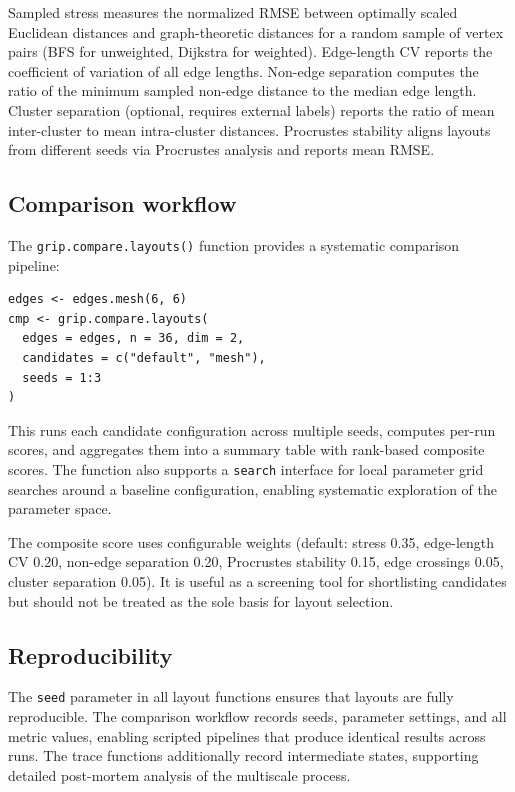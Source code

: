 Sampled stress measures the normalized RMSE between optimally scaled
Euclidean distances and graph-theoretic distances for a random sample of
vertex pairs (BFS for unweighted, Dijkstra for weighted). Edge-length
CV reports the coefficient of variation of all edge lengths. Non-edge
separation computes the ratio of the minimum sampled non-edge distance
to the median edge length. Cluster separation (optional, requires
external labels) reports the ratio of mean inter-cluster to mean
intra-cluster distances. Procrustes stability aligns layouts from
different seeds via Procrustes analysis and reports mean RMSE.

\subsection{Comparison workflow}

The \texttt{grip.compare.layouts()} function provides a systematic
comparison pipeline:

\begin{verbatim}
edges <- edges.mesh(6, 6)
cmp <- grip.compare.layouts(
  edges = edges, n = 36, dim = 2,
  candidates = c("default", "mesh"),
  seeds = 1:3
)
\end{verbatim}

This runs each candidate configuration across multiple seeds, computes
per-run scores, and aggregates them into a summary table with
rank-based composite scores. The function also supports a
\texttt{search} interface for local parameter grid searches around a
baseline configuration, enabling systematic exploration of the
parameter space.

The composite score uses configurable weights (default: stress 0.35,
edge-length CV 0.20, non-edge separation 0.20, Procrustes stability
0.15, edge crossings 0.05, cluster separation 0.05). It is useful as a
screening tool for shortlisting candidates but should not be treated as
the sole basis for layout selection.

\subsection{Reproducibility}

The \texttt{seed} parameter in all layout functions ensures that
layouts are fully reproducible. The comparison workflow records seeds,
parameter settings, and all metric values, enabling scripted pipelines
that produce identical results across runs. The trace functions
additionally record intermediate states, supporting detailed
post-mortem analysis of the multiscale process.


